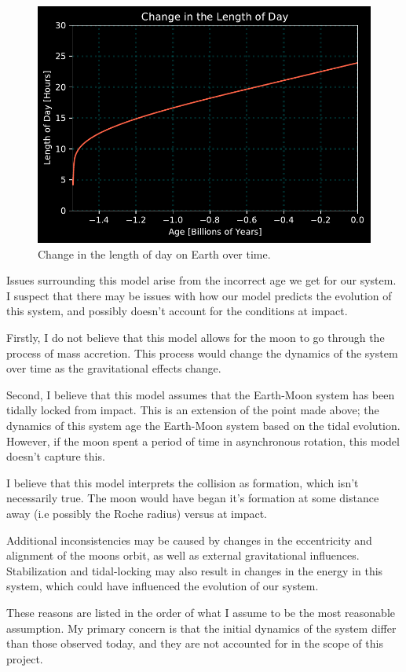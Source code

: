\documentclass{article}
\begin{document}
\begin{figure}[htp]
    \centering
    \includegraphics[width=12cm]{Q7.pdf}
    \caption{Change in the length of day on Earth over time.}
    \label{fig:Q7}
\end{figure}

Issues surrounding this model arise from the incorrect age we get for our system. I suspect that there may be issues with how our model predicts the evolution of this system, and possibly doesn't account for the conditions at impact.

Firstly, I do not believe that this model allows for the moon to go through the process of mass accretion. This process would change the dynamics of the system over time as the gravitational effects change.

Second, I believe that this model assumes that the Earth-Moon system has been tidally locked from impact. This is an extension of the point made above; the dynamics of this system age the Earth-Moon system based on the tidal evolution. However, if the moon spent a period of time in asynchronous rotation, this model doesn't capture this.

I believe that this model interprets the collision as formation, which isn't necessarily true. The moon would have began it's formation at some distance away (i.e possibly the Roche radius) versus at impact.

Additional inconsistencies may be caused by changes in the eccentricity and alignment of the moons orbit, as well as external gravitational influences. Stabilization and tidal-locking may also result in changes in the energy in this system, which could have influenced the evolution of our system. 

These reasons are listed in the order of what I assume to be the most reasonable assumption. My primary concern is that the initial dynamics of the system differ than those observed today, and they are not accounted for in the scope of this project.
\end{document}

